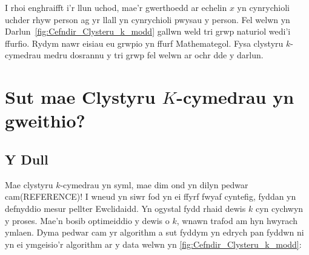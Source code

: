 I rhoi enghraifft i'r llun uchod, mae'r gwerthoedd ar echelin $x$ yn cynrychioli uchder rhyw person ag yr llall yn cynrychioli pwysau y person. Fel welwn yn Darlun~\ref{fig:Cefndir_Clysteru_k_modd} gallwn weld tri grwp naturiol wedi'i ffurfio. Rydym nawr eisiau eu grwpio yn ffurf Mathemategol. Fysa clystyru $k$-cymedrau medru dosrannu y tri grwp fel welwn ar ochr dde y darlun. 


\section{Sut mae Clystyru $K$-cymedrau yn gweithio?}

\subsection{Y Dull}

Mae clystyru $k$-cymedrau yn syml, mae dim ond yn dilyn pedwar cam(REFERENCE)! I wneud yn siwr fod yn ei ffyrf fwyaf cyntefig, fyddan yn defnyddio mesur pellter Ewclidaidd. Yn ogystal fydd rhaid dewis $k$ cyn cychwyn y proses. Mae'n bosib optimeiddio y dewis o $k$, wnawn trafod am hyn hwyrach ymlaen. Dyma pedwar cam yr algorithm a sut fyddym yn edrych pan fyddwn ni yn ei ymgeisio'r algorithm ar y data welwn yn \ref{fig:Cefndir_Clysteru_k_modd}:

